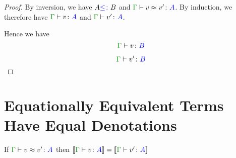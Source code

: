 \documentclass{report}
\begin{document}
\begin{framed}
\begin{proof}
        By inversion, we have $A {\color{blue} \leq\colon} B$ and $\gberelation{v}{v'}{A}$. By induction, we therefore have $\gtyperelation{v}{A}$ and $\gtyperelation{v'}{A}$.
        
        Hence we have 
        \begin{equation}
            \gtyperelation{v}{B}
        \end{equation}
        
        
        \begin{equation}
            \gtyperelation{v'}{B}
        \end{equation}
        
    \end{proof}
\end{framed}


\section{Equationally Equivalent Terms Have Equal Denotations}

\begin{theorem}
    If $\gberelation{v}{v'}{A}$ then $\gdenoequality{v}{v'}{A}$
\end{theorem}
\end{document}

